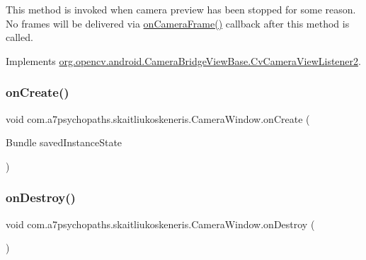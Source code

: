 This method is invoked when camera preview has been stopped for some reason. No frames will be delivered via \mbox{\hyperlink{classcom_1_1a7psychopaths_1_1skaitliukoskeneris_1_1_camera_window_a2ee3840e4c61b7ab95e2dc3f6407aad0}{on\+Camera\+Frame()}} callback after this method is called. 

Implements \mbox{\hyperlink{interfaceorg_1_1opencv_1_1android_1_1_camera_bridge_view_base_1_1_cv_camera_view_listener2_a0c02fc823ee690e08e6076611cff430b}{org.\+opencv.\+android.\+Camera\+Bridge\+View\+Base.\+Cv\+Camera\+View\+Listener2}}.

\mbox{\label{classcom_1_1a7psychopaths_1_1skaitliukoskeneris_1_1_camera_window_ab1a9b0e84f3a97826c665d40a3df91a5}} 
\subsubsection{\texorpdfstring{on\+Create()}{onCreate()}}
{\footnotesize\ttfamily void com.\+a7psychopaths.\+skaitliukoskeneris.\+Camera\+Window.\+on\+Create (\begin{DoxyParamCaption}\item[{Bundle}]{saved\+Instance\+State }\end{DoxyParamCaption})\hspace{0.3cm}{\ttfamily [protected]}}

\mbox{\label{classcom_1_1a7psychopaths_1_1skaitliukoskeneris_1_1_camera_window_a3a739c080b032f16a599e3473e169acb}} 
\subsubsection{\texorpdfstring{on\+Destroy()}{onDestroy()}}
{\footnotesize\ttfamily void com.\+a7psychopaths.\+skaitliukoskeneris.\+Camera\+Window.\+on\+Destroy (\begin{DoxyParamCaption}{ }\end{DoxyParamCaption})\hspace{0.3cm}{\ttfamily [protected]}}

